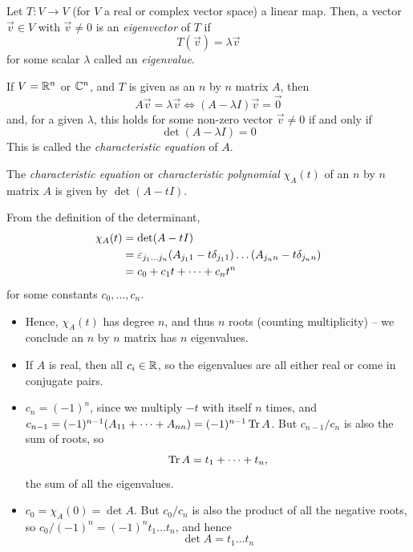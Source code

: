 \documentclass{../../template/note}
\begin{document}
    \begin{definition}
        Let \(T: V \to V\) (for \(V\) a real or complex vector space) a linear map. Then, a vector \(\vec v \in V\) with \(\vec v \neq 0\) is an \emph{eigenvector} of \(T\) if
        \[
            T(\vec v) = \lambda \vec v
        \]
        for some scalar \(\lambda\) called an \emph{eigenvalue}.
    \end{definition}
    
    If \(V = \mathbb R^n\) or \(\mathbb C^n\), and \(T\) is given as an \(n\) by \(n\) matrix \(A\), then
    \[
        A\vec v = \lambda \vec v \iff (A - \lambda I) \vec v = \vec 0
    \]
    and, for a given \(\lambda\), this holds for some non-zero vector \(\vec v \neq 0\) if and only if
    \[
        \det(A - \lambda I) = 0
    \]
    This is called the \emph{characteristic equation} of \(A\).

    \begin{definition}
        The \emph{characteristic equation} or \emph{characteristic polynomial} \(\chi_A(t)\) of an \(n\) by \(n\) matrix \(A\) is given by \(\det(A - tI)\).
    \end{definition}
    
    
    \begin{remark*}
        From the definition of the determinant,
        \begin{align*}
            \chi_A(t) &= \det(A - t I) \\
            &= \varepsilon_{j_1\dots j_n}(A_{j_11}-t\delta_{j_11})\dots(A_{j_nn}-t\delta_{j_nn}) \\
            &= c_0 + c_1t + \dots + c_nt^n
        \end{align*}
        for some constants \(c_0, \dots, c_n\).
        \begin{itemize}
            \item Hence, \(\chi_A(t)\) has degree \(n\), and thus \(n\) roots (counting multiplicity) -- we conclude an \(n\) by \(n\) matrix has \(n\) eigenvalues.
            \item If \(A\) is real, then all \(c_i \in \mathbb R\), so the eigenvalues are all either real or come in conjugate pairs.
            \item \(c_n = (-1)^n\), since we multiply \(-t\) with itself \(n\) times, and \(c_{n-1} = (-1)^{n-1}(A_{11} + \dots + A_{nn}) = (-1)^{n-1} \operatorname{Tr} A\). But \(c_{n-1}/c_n\) is also the sum of roots, so
            \[
                \operatorname{Tr} A = t_1 + \dots + t_n,
            \]
            the sum of all the eigenvalues.
            \item \(c_0 = \chi_A(0) = \det A\). But \(c_0/c_n\) is also the product of all the negative roots, so \(c_0/(-1)^n = (-1)^n t_1 \dots t_n\), and hence
            \[
                \det A = t_1 \dots t_n
            \]
        \end{itemize}
    \end{remark*}
    
\end{document}
